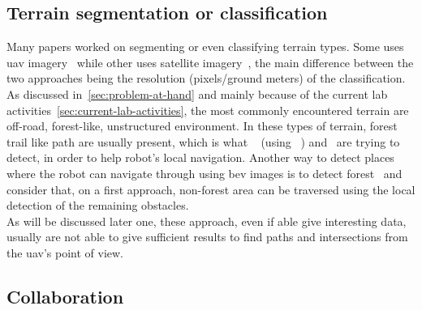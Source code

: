 \subsection{Terrain segmentation or classification}

Many papers worked on segmenting or even classifying terrain types.
Some uses \gls{uav} imagery~\parencite{khan_visual_2012} while other uses satellite imagery~\parencite{sofman_terrain_2006},
the main difference between the two approaches being the resolution (pixels/ground meters) of the classification.
As discussed in~\ref{sec:problem-at-hand} and mainly because of the current lab activities~\ref{sec:current-lab-activities},
the most commonly encountered terrain are off-road, forest-like, unstructured environment.
In these types of terrain, forest trail like path are usually present, which is what ~\cite{rasmussen_appearance_2009} (using ~\cite{rufus_blas_fast_2008})
and~\cite{giusti_machine_2016} are trying to detect, in order to help robot's local navigation.
Another way to detect places where the robot can navigate through using \gls{bev} images is to detect forest~\parencite{bosch_journal_2020}
and consider that, on a first approach, non-forest area can be traversed using the local detection of the remaining obstacles.\\
As will be discussed later one, these approach, even if able give interesting data, usually are not able to give
sufficient results to find paths and intersections from the \gls{uav}'s point of view.

\subsection{Collaboration}\label{subsec:collaboration}

